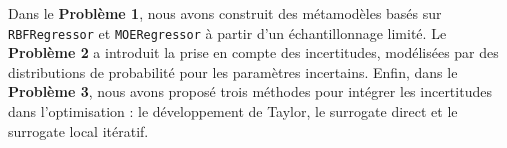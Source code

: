 \documentclass[a4paper, 11pt]{article}
\begin{document}
Dans le \textbf{Problème 1}, nous avons construit des métamodèles basés sur \texttt{RBFRegressor} et \texttt{MOERegressor} à partir d'un échantillonnage limité. Le \textbf{Problème 2} a introduit la prise en compte des incertitudes, modélisées par des distributions de probabilité pour les paramètres incertains. Enfin, dans le \textbf{Problème 3}, nous avons proposé trois méthodes pour intégrer les incertitudes dans l'optimisation : le développement de Taylor, le surrogate direct et le surrogate local itératif.
\end{document}

